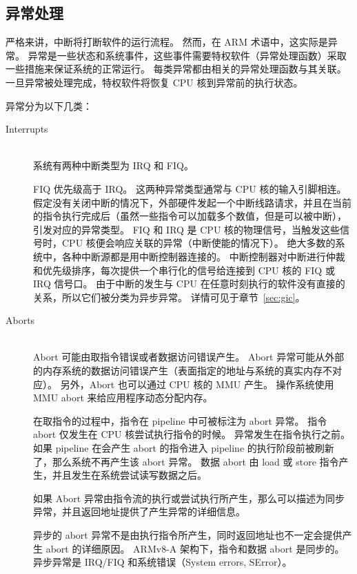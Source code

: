 \subsection{异常处理} \label{sec:exception}

严格来讲，中断将打断软件的运行流程。
然而，在 ARM 术语中，这实际是异常。
异常是一些状态和系统事件，这些事件需要特权软件（异常处理函数）采取一些措施来保证系统的正常运行。
每类异常都由相关的异常处理函数与其关联。
一旦异常被处理完成，特权软件将恢复 CPU 核到异常前的执行状态。

异常分为以下几类：

\begin{description}
  \item[{Interrupts}] \hfill \\
    系统有两种中断类型为 IRQ 和 FIQ。

    FIQ 优先级高于 IRQ。
    这两种异常类型通常与 CPU 核的输入引脚相连。
    假定没有关闭中断的情况下，外部硬件发起一个中断线路请求，并且在当前的指令执行完成后（虽然一些指令可以加载多个数值，但是可以被中断），引发对应的异常类型。
    FIQ 和 IRQ 是 CPU 核的物理信号，当触发这些信号时，CPU 核便会响应关联的异常（中断使能的情况下）。
    绝大多数的系统中，各种中断源都是用中断控制器连接的。
    中断控制器对中断进行仲裁和优先级排序，每次提供一个串行化的信号给连接到 CPU 核的 FIQ 或 IRQ 信号口。
    由于中断的发生与 CPU 在任意时刻执行的软件没有直接的关系，所以它们被分类为异步异常。
    详情可见于章节~\ref{sec:gic}。

  \item[{Aborts}] \hfill \\
    Abort 可能由取指令错误或者数据访问错误产生。
    Abort 异常可能从外部的内存系统的数据访问错误产生（表面指定的地址与系统的真实内存不对应）。
    另外，Abort 也可以通过 CPU 核的 MMU 产生。
    操作系统使用 MMU abort 来给应用程序动态分配内存。

    在取指令的过程中，指令在 pipeline 中可被标注为 abort 异常。
    指令 abort 仅发生在 CPU 核尝试执行指令的时候。
    异常发生在指令执行之前。
    如果 pipeline 在会产生 abort 的指令进入 pipeline 的执行阶段前被刷新了，那么系统不再产生该 abort 异常。
    数据 abort 由 load 或 store 指令产生，并且发生在系统尝试读写数据之后。

    如果 Abort 异常由指令流的执行或尝试执行所产生，那么可以描述为同步异常，并且返回地址提供了产生异常的详细信息。

    异步的 abort 异常不是由执行指令所产生，同时返回地址也不一定会提供产生 abort 的详细原因。
    ARMv8-A 架构下，指令和数据 abort 是同步的。
    异步异常是 IRQ/FIQ 和系统错误（System errors, SError）。


\end{description}
